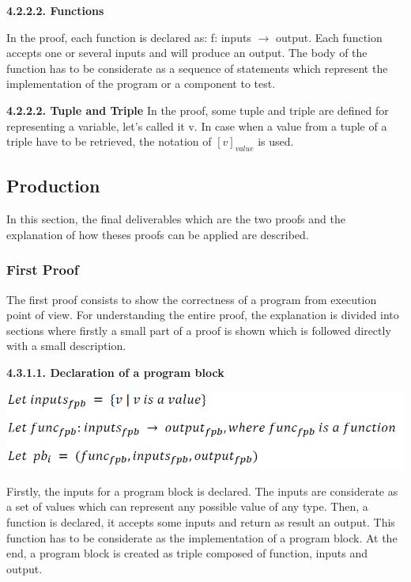 \documentclass[conference,compsoc]{IEEEtran}
\begin{document}
\noindent
\newline  
\textbf{4.2.2.2. Functions}
\newline

In the proof, each function is declared as: f: inputs $\to$ output. Each function accepts one or several inputs and will produce an output. The body of the function has to be considerate as a sequence of statements which represent the implementation of the program or a component to test.

\noindent
\newline  
\textbf{4.2.2.2. Tuple and Triple}
\newline
In the proof, some tuple and triple are defined for representing a variable, let's called it v. In case when a value from a tuple of a triple have to be retrieved, the notation of $[v]_{value}$ is used. 

\subsection{Production }
In this section, the final deliverables which are the two proofs and the explanation of how theses proofs can be applied are described.

\subsubsection{First Proof}
The first proof consists to show the correctness of a program from execution point of view. For understanding the entire proof, the explanation is divided into sections where firstly a small part of a proof is shown which is followed directly with a small description. 

\noindent
\newline
\textbf{4.3.1.1. Declaration of a program block}
\begin{center}
\includegraphics[scale=0.5]{Proof1-Part1.png} 
\end{center}

Firstly, the inputs for a program block is declared. The inputs are considerate as a set of values which can represent any possible value of any type. Then, a function is declared, it accepts some inputs and return as result an output. This function has to be considerate as the implementation of a program block. At the end, a program block is created as triple composed of function, inputs and output. 
\end{document}
